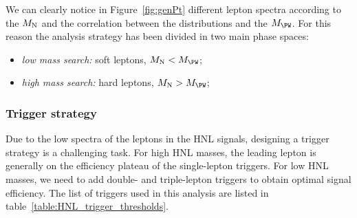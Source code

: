 We can clearly notice in Figure~\ref{fig:genPt} different lepton \pt spectra according to the
$M_\mathrm{N}$ and the correlation between the distributions and the $M_\PW$. For this reason the analysis
strategy has been divided in two main phase spaces:
\begin{itemize}
\setlength\itemsep{-0.2em}
\item \emph{low mass search:} soft leptons, $M_\hnl < M_\PW$;
\item \emph{high mass search:} hard leptons, $M_\hnl > M_\PW$;
\end{itemize}

\subsubsection{Trigger strategy}
Due to the low \pt spectra of the leptons in the HNL signals, designing a trigger strategy is a challenging task. 
For high HNL masses, the leading lepton \pt is generally on the efficiency plateau of the single-lepton triggers.
For low HNL masses, we need to add double- and triple-lepton triggers to obtain optimal signal efficiency.
The list of triggers used in this analysis are listed in table~\ref{table:HNL_trigger_thresholds}.


